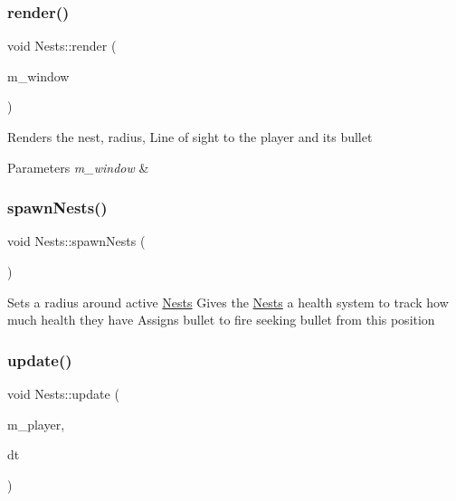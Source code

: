 \subsubsection{\texorpdfstring{render()}{render()}}
{\footnotesize\ttfamily void Nests\+::render (\begin{DoxyParamCaption}\item[{sf\+::\+Render\+Window \&}]{m\+\_\+window }\end{DoxyParamCaption})}



Renders the nest, radius, Line of sight to the player and its bullet 


\begin{DoxyParams}{Parameters}
{\em m\+\_\+window} & \\
\hline
\end{DoxyParams}
\mbox{\label{class_nests_a2d63aa3b2e3a72954f995485b173e5f1}} 
\subsubsection{\texorpdfstring{spawnNests()}{spawnNests()}}
{\footnotesize\ttfamily void Nests\+::spawn\+Nests (\begin{DoxyParamCaption}{ }\end{DoxyParamCaption})}



Sets a radius around active \mbox{\hyperlink{class_nests}{Nests}} Gives the \mbox{\hyperlink{class_nests}{Nests}} a health system to track how much health they have Assigns bullet to fire seeking bullet from this position 

\mbox{\label{class_nests_a90eb0853ddad202743d19375b9d8d76b}} 
\subsubsection{\texorpdfstring{update()}{update()}}
{\footnotesize\ttfamily void Nests\+::update (\begin{DoxyParamCaption}\item[{\mbox{\hyperlink{class_player}{Player}} \&}]{m\+\_\+player,  }\item[{double}]{dt }\end{DoxyParamCaption})}



